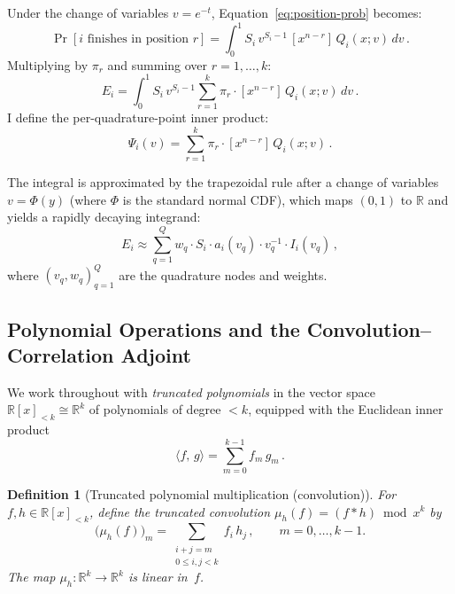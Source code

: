 \documentclass[11pt]{article}
\newtheorem{definition}[theorem]{Definition}
\newcommand{\ip}[2]{\langle #1,\, #2 \rangle}
\begin{document}
Under the change of variables $v = e^{-t}$, Equation~\ref{eq:position-prob}
becomes:
\begin{equation}\label{eq:position-gf}
  \Pr[i \text{ finishes in position } r]
  = \int_0^1 S_i \, v^{S_i - 1}\, [x^{n-r}]\, Q_i(x; v) \, dv\,.
\end{equation}
Multiplying by $\pi_r$ and summing over $r = 1, \ldots, k$:
\begin{equation}\label{eq:equity-integral}
  E_i = \int_0^1 S_i \, v^{S_i - 1}
    \sum_{r=1}^{k} \pi_r \cdot [x^{n-r}]\, Q_i(x; v) \, dv\,.
\end{equation}
I define the per-quadrature-point inner product:
\begin{equation}\label{eq:inner-product}
  \Psi_i(v) = \sum_{r=1}^{k} \pi_r \cdot [x^{n-r}]\, Q_i(x; v)\,.
\end{equation}

The integral is approximated by the trapezoidal rule after a change of
variables $v = \Phi(y)$ (where $\Phi$ is the standard normal CDF), which
maps $(0,1)$ to $\mathbb{R}$ and yields a rapidly decaying integrand:
\begin{equation}\label{eq:quadrature}
  E_i \approx \sum_{q=1}^{Q} w_q \cdot S_i \cdot a_i(v_q) \cdot v_q^{-1}
    \cdot I_i(v_q)\,,
\end{equation}
where $(v_q, w_q)_{q=1}^Q$ are the quadrature nodes and weights.

\subsection{Polynomial Operations and the Convolution--Correlation Adjoint}
\label{sec:conv-adj}

We work throughout with \emph{truncated polynomials} in the vector space
$\mathbb{R}[x]_{<k} \cong \mathbb{R}^k$ of polynomials of degree
$< k$, equipped with the Euclidean inner product
\begin{equation}\label{eq:poly-ip}
  \ip{f}{g} = \sum_{m=0}^{k-1} f_m \, g_m\,.
\end{equation}

\begin{definition}[Truncated polynomial multiplication (convolution)]
For $f, h \in \mathbb{R}[x]_{<k}$, define the truncated convolution
$\mu_h(f) = (f * h) \bmod x^k$ by
\begin{equation}\label{eq:trunc-conv}
  \bigl(\mu_h(f)\bigr)_m
  = \sum_{\substack{i+j=m \\ 0 \le i,j < k}} f_i \, h_j\,,
  \qquad m = 0, \ldots, k-1.
\end{equation}
The map $\mu_h \colon \mathbb{R}^k \to \mathbb{R}^k$ is linear in~$f$.
\end{definition}
\end{document}
